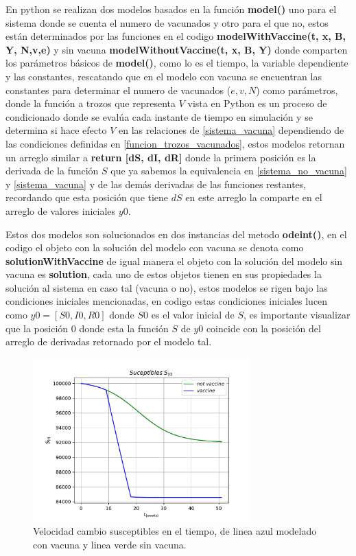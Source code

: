 En python se realizan dos modelos basados en la función \textbf{model()} uno para el sistema donde se cuenta el numero de vacunados y otro para el que no, estos están determinados por las funciones en el codigo \cite{codigo-articulo}  \textbf{modelWithVaccine(t, x, B, Y, N,v,e)} y sin vacuna \textbf{modelWithoutVaccine(t, x, B, Y)} donde comparten los parámetros básicos de \textbf{model()}, como lo es el tiempo, la variable dependiente y las constantes, rescatando que en el modelo con vacuna se encuentran las constantes para determinar el numero de vacunados ($e,v,N$) como parámetros, donde la función a trozos que representa $V$ vista en Python es un proceso de condicionado donde se evalúa cada instante de tiempo en simulación y se determina si hace efecto $V$ en las relaciones de \ref{sistema_vacuna} dependiendo de las condiciones definidas en \ref{funcion_trozos_vacunados}, estos modelos retornan un arreglo similar a \textbf{return [dS, dI, dR]} donde la primera posición es la derivada de la función $S$ que ya sabemos la equivalencia en \ref{sistema_no_vacuna} y \ref{sistema_vacuna} y de las demás derivadas de las funciones restantes, recordando que esta posición que tiene $dS$ en este arreglo la comparte en el arreglo de valores iniciales $y0$.

Estos dos modelos son solucionados en dos instancias del metodo \textbf{odeint()}, en el codigo \cite{} el objeto con la solución del modelo con vacuna se denota como \textbf{solutionWithVaccine} de igual manera el objeto con la solución del modelo sin vacuna es \textbf{solution}, cada uno de estos objetos tienen en sus propiedades la solución al sistema en caso tal (vacuna o no), estos modelos se rigen bajo las condiciones iniciales mencionadas, en codigo estas condiciones iniciales lucen como $y0 = [S0, I0, R0]$ donde $S0$ es el valor inicial de $S$, es importante visualizar que la posición 0 donde esta la función $S$ de $y0$ coincide con la posición del arreglo de derivadas retornado por el modelo tal.

\begin{figure}[h]
  \begin{center}
  \includegraphics[width=3.3in]{pdf/suceptilbles.pdf}
  \caption{Velocidad cambio susceptibles en el tiempo, de linea azul modelado con vacuna y linea verde sin vacuna. }\label{sucepti-graf}
  \end{center}
\end{figure}

